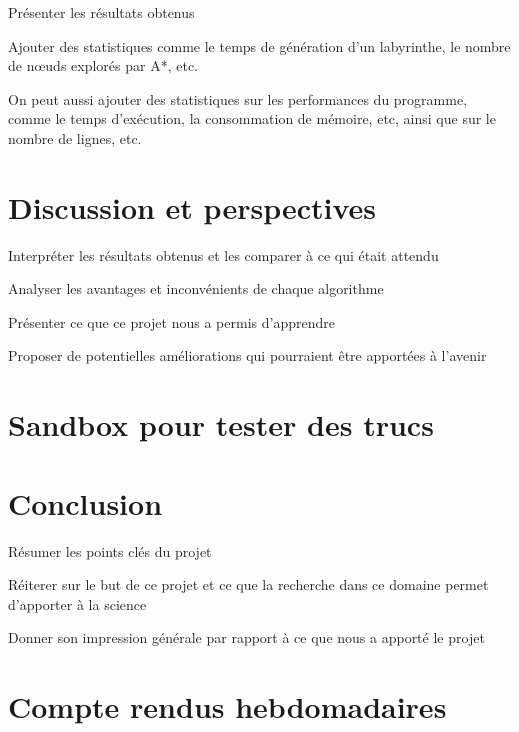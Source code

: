 \documentclass[12pt]{scrreprt} %
\begin{document}
Présenter les résultats obtenus

Ajouter des statistiques comme le temps de génération d'un labyrinthe, le nombre de nœuds explorés par A*, etc.

On peut aussi ajouter des statistiques sur les performances du programme, comme le temps d'exécution, la consommation de mémoire, etc, ainsi que sur le nombre de lignes, etc.

\chapter{Discussion et perspectives}

Interpréter les résultats obtenus et les comparer à ce qui était attendu

Analyser les avantages et inconvénients de chaque algorithme

Présenter ce que ce projet nous a permis d'apprendre

Proposer de potentielles améliorations qui pourraient être apportées à l'avenir



\chapter{Sandbox pour tester des trucs}


\chapter*{Conclusion}

Résumer les points clés du projet

Réiterer sur le but de ce projet et ce que la recherche dans ce domaine permet d'apporter à la science

Donner son impression générale par rapport à ce que nous a apporté le projet

\newpage %
\renewcommand{\bibname}{Bibliographie} %


\chapter*{Compte rendus hebdomadaires}
\end{document}
